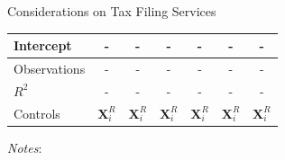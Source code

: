 \documentclass{beamer}
\begin{document}
\begin{frame}{Considerations on Tax Filing Services}
\begin{table}[!htbp]
{\begin{threeparttable}
\begin{tabular}{l|cc|cc|cc}
Intercept &- &- &- &- &- &- \\
\midrule
Observations                        &-    &-    &-    &-    &-    &- \\
$R^2$                               &-    &-    &-    &-    &-    &- \\
Controls                            & $\mathbf{X}_{i}^{R}$    & $\mathbf{X}_{i}^{R}$    & $\mathbf{X}_{i}^{R}$    & $\mathbf{X}_{i}^{R}$     & $\mathbf{X}_{i}^{R}$    & $\mathbf{X}_{i}^{R}$  \\
\bottomrule
\end{tabular}
\begin{tablenotes}[flushleft]
\item \textit{Notes}:   
\end{tablenotes}
\end{threeparttable} }
\end{table}
\hfill \hyperlink{posttreatment}{} \hyperlink{equations1}{}
\end{frame}
\end{document}
